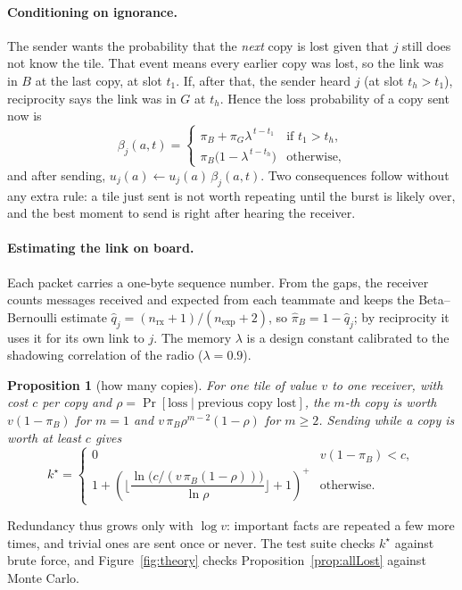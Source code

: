 \documentclass[11pt,a4paper]{article}
\newtheorem{proposition}{Proposition}
\theoremstyle{definition}
\newcommand{\pos}[1]{\left(#1\right)^{+}}
\begin{document}
\paragraph{Conditioning on ignorance.} The sender wants the probability that the \emph{next} copy is lost given that $j$ still does not know the tile. That event means every earlier copy was lost, so the link was in $B$ at the last copy, at slot $t_1$. If, after that, the sender heard $j$ (at slot $t_h>t_1$), reciprocity says the link was in $G$ at $t_h$. Hence the loss probability of a copy sent now is
\begin{equation}\label{eq:beta}
\beta_j(a,t)=\begin{cases}\pi_B+\pi_G\lambda^{\,t-t_1}&\text{if }t_1>t_h,\\[2pt] \pi_B\big(1-\lambda^{\,t-t_h}\big)&\text{otherwise,}\end{cases}
\end{equation}
and after sending, $u_j(a)\leftarrow u_j(a)\,\beta_j(a,t)$. Two consequences follow without any extra rule: a tile just sent is not worth repeating until the burst is likely over, and the best moment to send is right after hearing the receiver.

\paragraph{Estimating the link on board.} Each packet carries a one-byte sequence number. From the gaps, the receiver counts messages received and expected from each teammate and keeps the Beta--Bernoulli estimate $\hat q_j=(n_{\mathrm{rx}}+1)/(n_{\mathrm{exp}}+2)$, so $\hat\pi_B=1-\hat q_j$; by reciprocity it uses it for its own link to $j$. The memory $\lambda$ is a design constant calibrated to the shadowing correlation of the radio ($\lambda=0.9$).

\begin{proposition}[how many copies]\label{prop:kstar}
For one tile of value $v$ to one receiver, with cost $c$ per copy and $\rho=\Pr[\text{loss}\mid\text{previous copy lost}]$, the $m$-th copy is worth $v(1-\pi_B)$ for $m=1$ and $v\,\pi_B\rho^{m-2}(1-\rho)$ for $m\ge2$. Sending while a copy is worth at least $c$ gives
\[
k^\star=\begin{cases}0&v(1-\pi_B)<c,\\ 1+\pos{\Big\lfloor\dfrac{\ln\big(c/(v\,\pi_B(1-\rho))\big)}{\ln\rho}\Big\rfloor+1}&\text{otherwise.}\end{cases}
\]
\end{proposition}
Redundancy thus grows only with $\log v$: important facts are repeated a few more times, and trivial ones are sent once or never. The test suite checks $k^\star$ against brute force, and Figure~\ref{fig:theory} checks Proposition~\ref{prop:allLost} against Monte Carlo.
\end{document}
